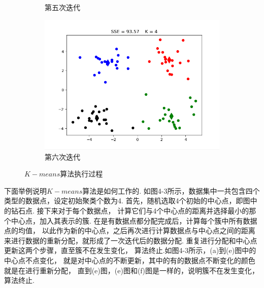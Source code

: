 \documentclass[bachelor,adobefonts]{jnuthesis}
\begin{document}
\begin{figure}[h!]
\begin{subfigure}[b]{0.4\linewidth}
    \caption{第五次迭代}
  \end{subfigure}
  \begin{subfigure}[b]{0.4\linewidth}
    \includegraphics[width=\linewidth]{W4-6.png}
    \caption{第六次迭代}
  \end{subfigure}
  \caption{$K-means$算法执行过程}
\end{figure}

下面举例说明$K-means$算法是如何工作的.
如图4-3所示，数据集中一共包含四个类型的数据点，设定初始聚类个数为4.
首先，随机选取4个初始的中心点，即图中的钻石点.
接下来对于每个数据点，
计算它们与4个中心点的距离并选择最小的那个中心点，加入其表示的簇.
在是有数据点都分配完成后，计算每个簇中所有数据点的均值，
以此作为新的中心点，之后再次进行计算数据点与中心点之间的距离
来进行数据的重新分配，就形成了一次迭代后的数据分配.
重复进行分配和中心点更新这两个步骤，直至簇不在发生变化，
算法终止.如图4-3所示，(a)到(e)图中的中心点不点变化，
就是对中心点的不断更新，其中的有的数据点不断变化的颜色就是在进行重新分配，
直到(e)图，(e)图和(f)图是一样的，说明簇不在发生变化，算法终止.
\end{document}
